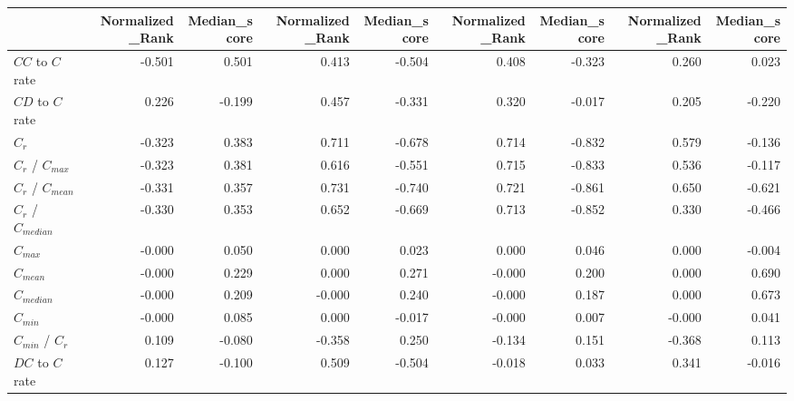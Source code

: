 \begin{tabular}{lrrrrrrrr}
\toprule
{} &  Normalized_Rank &  Median_score &  Normalized_Rank &  Median_score &  Normalized_Rank &  Median_score &  Normalized_Rank &  Median_score \\
\midrule
$CC$ to $C$ rate     &           -0.501 &         0.501 &            0.413 &        -0.504 &            0.408 &        -0.323 &            0.260 &         0.023 \\
$CD$ to $C$ rate     &            0.226 &        -0.199 &            0.457 &        -0.331 &            0.320 &        -0.017 &            0.205 &        -0.220 \\
$C_r$                &           -0.323 &         0.383 &            0.711 &        -0.678 &            0.714 &        -0.832 &            0.579 &        -0.136 \\
$C_r$ / $C_{max}$    &           -0.323 &         0.381 &            0.616 &        -0.551 &            0.715 &        -0.833 &            0.536 &        -0.117 \\
$C_r$ / $C_{mean}$   &           -0.331 &         0.357 &            0.731 &        -0.740 &            0.721 &        -0.861 &            0.650 &        -0.621 \\
$C_r$ / $C_{median}$ &           -0.330 &         0.353 &            0.652 &        -0.669 &            0.713 &        -0.852 &            0.330 &        -0.466 \\
$C_{max}$            &           -0.000 &         0.050 &            0.000 &         0.023 &            0.000 &         0.046 &            0.000 &        -0.004 \\
$C_{mean}$           &           -0.000 &         0.229 &            0.000 &         0.271 &           -0.000 &         0.200 &            0.000 &         0.690 \\
$C_{median}$         &           -0.000 &         0.209 &           -0.000 &         0.240 &           -0.000 &         0.187 &            0.000 &         0.673 \\
$C_{min}$            &           -0.000 &         0.085 &            0.000 &        -0.017 &           -0.000 &         0.007 &           -0.000 &         0.041 \\
$C_{min}$ / $C_r$    &            0.109 &        -0.080 &           -0.358 &         0.250 &           -0.134 &         0.151 &           -0.368 &         0.113 \\
$DC$ to $C$ rate     &            0.127 &        -0.100 &            0.509 &        -0.504 &           -0.018 &         0.033 &            0.341 &        -0.016 \\

\end{tabular}
